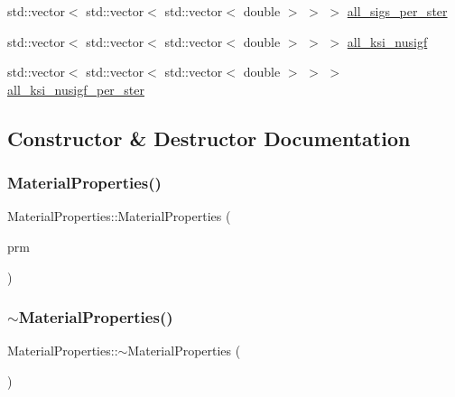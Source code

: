 \begin{DoxyCompactItemize}
\item 
std\+::vector$<$ std\+::vector$<$ std\+::vector$<$ double $>$ $>$ $>$ \hyperlink{class_material_properties_a206fc7b81483c3430de643b4dc6598a4}{all\+\_\+sigs\+\_\+per\+\_\+ster}
\item 
std\+::vector$<$ std\+::vector$<$ std\+::vector$<$ double $>$ $>$ $>$ \hyperlink{class_material_properties_a76c5f9ee2a768ee26cb5ed3c2c78a395}{all\+\_\+ksi\+\_\+nusigf}
\item 
std\+::vector$<$ std\+::vector$<$ std\+::vector$<$ double $>$ $>$ $>$ \hyperlink{class_material_properties_ae44a1ebbeefb9400b02f21ad30086017}{all\+\_\+ksi\+\_\+nusigf\+\_\+per\+\_\+ster}
\end{DoxyCompactItemize}


\subsection{Constructor \& Destructor Documentation}
\mbox{\label{class_material_properties_a9c1a2ff5f7cfaacd4b992e96186fbf81}} 
\subsubsection{\texorpdfstring{Material\+Properties()}{MaterialProperties()}}
{\footnotesize\ttfamily Material\+Properties\+::\+Material\+Properties (\begin{DoxyParamCaption}\item[{Parameter\+Handler \&}]{prm }\end{DoxyParamCaption})}

\mbox{\label{class_material_properties_aab94335e9db402f624b88603b233bcab}} 
\subsubsection{\texorpdfstring{$\sim$\+Material\+Properties()}{~MaterialProperties()}}
{\footnotesize\ttfamily Material\+Properties\+::$\sim$\+Material\+Properties (\begin{DoxyParamCaption}{ }\end{DoxyParamCaption})}



